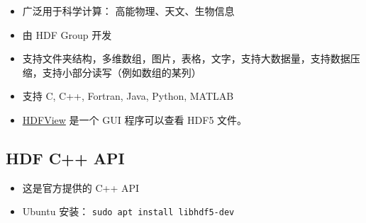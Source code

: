 

\begin{issues}
\issueDraft
\end{issues}

\begin{itemize}
\item 广泛用于科学计算： 高能物理、天文、生物信息
\item 由 HDF Group 开发
\item 支持文件夹结构，多维数组，图片，表格，文字，支持大数据量，支持数据压缩，支持小部分读写（例如数组的某列）
\item 支持 C, C++, Fortran, Java, Python, MATLAB
\item \href{https://www.hdfgroup.org/downloads/hdfview/}{HDFView} 是一个 GUI 程序可以查看 HDF5 文件。
\end{itemize}

\subsection{HDF C++ API}
\begin{itemize}
\item 这是官方提供的 C++ API
\item Ubuntu 安装： \verb|sudo apt install libhdf5-dev|
\end{itemize}

